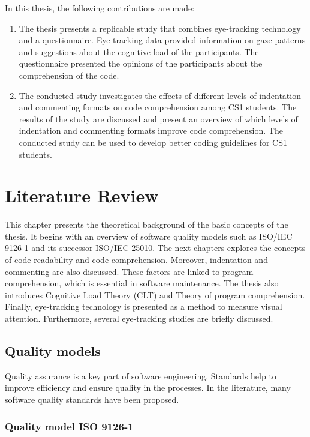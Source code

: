 In this thesis, the following contributions are made:
\begin{enumerate}

\item The thesis presents a replicable study that combines eye-tracking technology and a questionnaire. Eye tracking data provided information on gaze patterns and suggestions about the cognitive load of the participants. The questionnaire presented the opinions of the participants about the comprehension of the code.

\item  The conducted study investigates the effects of different levels of indentation and commenting formats on code comprehension among CS1 students. The results of the study are discussed and present an overview of which levels of indentation and commenting formats improve code comprehension. The conducted study can be used to develop better coding guidelines for CS1 students.

\end{enumerate}

\chapter{Literature Review}
This chapter presents the theoretical background of the basic concepts of the thesis. It begins with an overview of software quality models such as ISO/IEC 9126-1 and its successor ISO/IEC 25010. The next chapters explores the concepts of code readability and code comprehension. Moreover, indentation and commenting are also discussed. These factors are  linked to program comprehension, which is essential in software maintenance. The thesis also introduces Cognitive Load Theory (CLT) and Theory of program comprehension. Finally,  eye-tracking technology is presented as a method to measure visual attention. Furthermore, several eye-tracking studies are briefly discussed. 



\section{Quality models}
Quality assurance is a key part of software engineering. Standards help to improve efficiency and ensure quality in the processes. In the literature, many software quality standards have been proposed.



\subsection{Quality model ISO 9126-1}

